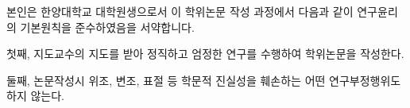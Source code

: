 
\doublespacing
본인은 한양대학교 대학원생으로서 이 학위논문 작성 과정에서 다음과 같이 연구윤리의 기본원칙을 준수하였음을 서약합니다.

첫째, 지도교수의 지도를 받아 정직하고 엄정한 연구를 수행하여 학위논문을 작성한다.
 
둘째, 논문작성시 위조, 변조, 표절 등 학문적 진실성을 훼손하는 어떤 연구부정행위도 하지 않는다.
